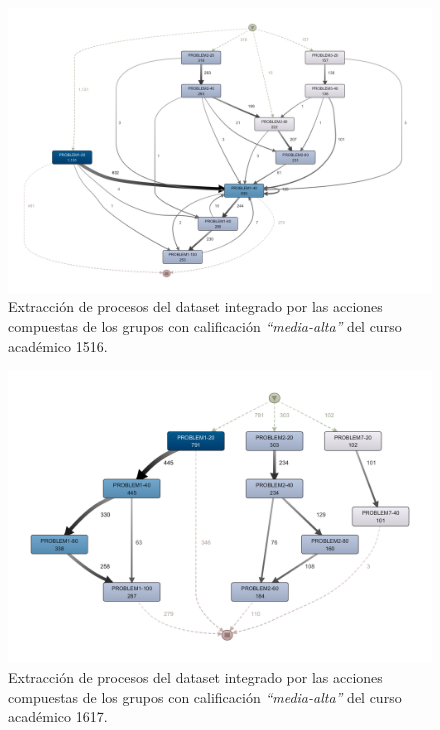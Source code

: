 \begin{figure}[H]
    \centering
    \includegraphics[width=1.25\textwidth]{imagenes/DISCO_compound/Year1516MidHighGrades.png}
    \caption{Extracción de procesos del dataset integrado por las acciones compuestas de los grupos con calificación \emph{``media-alta''} del curso académico 1516.}
    \label{fig:year1516MidHighGrades}
\end{figure}

\begin{figure}[H]
    \centering
    \includegraphics[width=1.25\textwidth]{imagenes/DISCO_compound/Year1617MidHighGrades.png}
    \caption{Extracción de procesos del dataset integrado por las acciones compuestas de los grupos con calificación \emph{``media-alta''} del curso académico 1617.}
    \label{fig:year1617MidHighGrades}
\end{figure}

